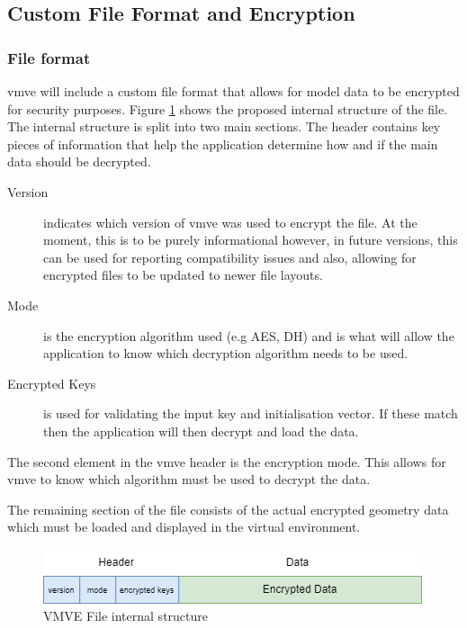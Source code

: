 \documentclass[11pt]{article}
\begin{document}
\subsection{Custom File Format and Encryption}

\subsubsection{File format}
\gls*{vmve} will include a custom file format that allows for model data to be
encrypted for security purposes. Figure \ref{fig:vmve_file_structure} shows the
proposed internal structure of the file. The internal structure is split into
two main sections. The header contains key pieces of information that help the
application determine how and if the main data should be decrypted.

\begin{description}
  \item[Version] indicates which version of \gls*{vmve} was used to encrypt the
  file. At the moment, this is to be purely informational however, in future
  versions, this can be used for reporting compatibility issues and also,
  allowing for encrypted files to be updated to newer file layouts.
  \item[Mode] is the encryption algorithm used (e.g AES, DH) and is what will
  allow the application to know which decryption algorithm needs to be used.
  \item[Encrypted Keys] is used for validating the input key and initialisation
  vector. If these match then the application will then decrypt and load the data.
\end{description}

The second element in the \gls*{vmve} header is the encryption mode. This allows
for \gls*{vmve} to know which algorithm must be used to decrypt the data.

The remaining section of the file consists of the actual encrypted geometry data
which must be loaded and displayed in the virtual environment.

\begin{figure}[H]
  \centering
  \includegraphics[width=\textwidth]{images/vmve_file_structure.png}
  \caption{VMVE File internal structure}
  \label{fig:vmve_file_structure}
\end{figure}
\end{document}
